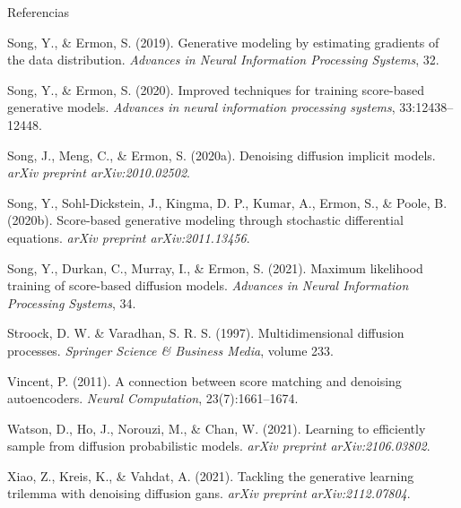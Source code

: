 \documentclass[aspectratio=169,xcolor=dvipsnames, t, spanish]{beamer}
\begin{document}
\begin{frame}{Referencias}
{\begin{thebibliography}{99}
                 Song, Y., \& Ermon, S. (2019).
                \newblock Generative modeling by estimating gradients of the data distribution.
                \newblock \emph{Advances in Neural Information Processing Systems}, 32.
    
                 Song, Y., \& Ermon, S. (2020).
                \newblock Improved techniques for training score-based generative models.
                \newblock \emph{Advances in neural information processing systems}, 33:12438–12448.
    
                 Song, J., Meng, C., \& Ermon, S. (2020a).
                \newblock Denoising diffusion implicit models.
                \newblock \emph{arXiv preprint arXiv:2010.02502}.
    
                 Song, Y., Sohl-Dickstein, J., Kingma, D. P., Kumar, A., Ermon, S., \& Poole, B. (2020b).
                \newblock Score-based generative modeling through stochastic differential equations.
                \newblock \emph{arXiv preprint arXiv:2011.13456}.
    
                 Song, Y., Durkan, C., Murray, I., \& Ermon, S. (2021).
                \newblock Maximum likelihood training of score-based diffusion models.
                \newblock \emph{Advances in Neural Information Processing Systems}, 34.
                
                 Stroock, D. W. \& Varadhan, S. R. S. (1997).
                \newblock Multidimensional diffusion processes.
                \newblock \emph{Springer Science \& Business Media}, volume 233.
    
                 Vincent, P. (2011).
                \newblock A connection between score matching and denoising autoencoders.
                \newblock \emph{Neural Computation}, 23(7):1661–1674.
                
                 Watson, D., Ho, J., Norouzi, M., \& Chan, W. (2021).
                \newblock Learning to efficiently sample from diffusion probabilistic models.
                \newblock \emph{arXiv preprint arXiv:2106.03802}.
    
                 Xiao, Z., Kreis, K., \& Vahdat, A. (2021).
                \newblock Tackling the generative learning trilemma with denoising diffusion gans.
                \newblock \emph{arXiv preprint arXiv:2112.07804}.
    

\end{thebibliography}}
\end{frame}
\end{document}
